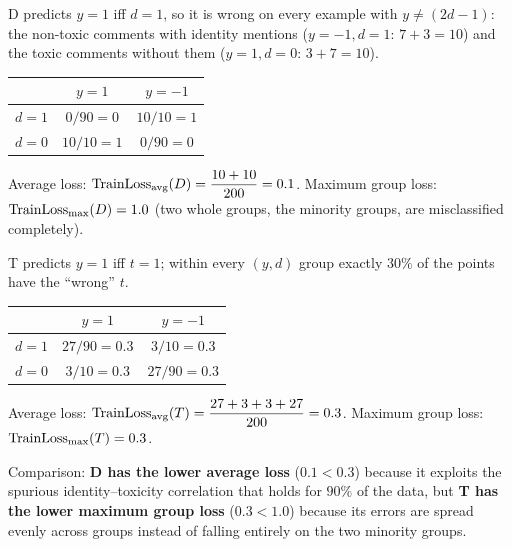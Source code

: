 \begin{solution}
D predicts $y=1$ iff $d=1$, so it is wrong on every example with $y\neq(2d-1)$: the non-toxic comments with
identity mentions ($y=-1,d=1$: $7+3=10$) and the toxic comments without them ($y=1,d=0$: $3+7=10$).
\begin{center}
\begin{tabular}{lcc}
\toprule
 & $y=1$ & $y=-1$\\
\midrule
$d=1$ & $0/90=0$ & $10/10=1$\\
$d=0$ & $10/10=1$ & $0/90=0$\\
\bottomrule
\end{tabular}
\end{center}
Average loss: $\text{TrainLoss}_{\text{avg}}(D)=\dfrac{10+10}{200}=0.1$. \quad Maximum group loss: $\text{TrainLoss}_{\max}(D)=1.0$
(two whole groups, the minority groups, are misclassified completely).
\end{solution}

\begin{solution}
T predicts $y=1$ iff $t=1$; within every $(y,d)$ group exactly $30\%$ of the points have the ``wrong'' $t$.
\begin{center}
\begin{tabular}{lcc}
\toprule
 & $y=1$ & $y=-1$\\
\midrule
$d=1$ & $27/90=0.3$ & $3/10=0.3$\\
$d=0$ & $3/10=0.3$ & $27/90=0.3$\\
\bottomrule
\end{tabular}
\end{center}
Average loss: $\text{TrainLoss}_{\text{avg}}(T)=\dfrac{27+3+3+27}{200}=0.3$. \quad Maximum group loss: $\text{TrainLoss}_{\max}(T)=0.3$.

Comparison: \textbf{D has the lower average loss} ($0.1<0.3$) because it exploits the spurious
identity--toxicity correlation that holds for $90\%$ of the data, but \textbf{T has the lower maximum group
loss} ($0.3<1.0$) because its errors are spread evenly across groups instead of falling entirely on the two
minority groups.
\end{solution}


